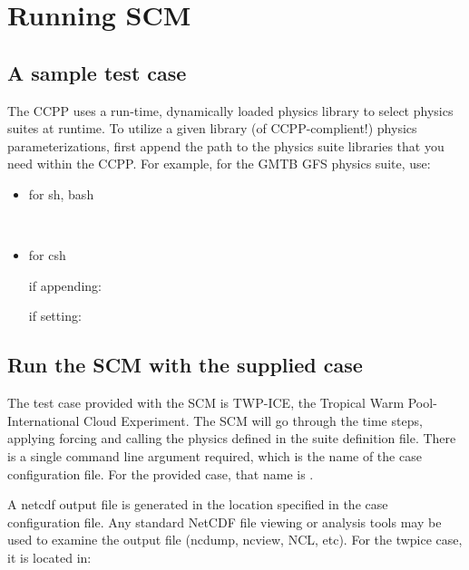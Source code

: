 \chapter{Running SCM}
\label{chapter: runningscm}
\setlength{\parskip}{12pt}
\label{section: runningscm}

\section{A sample test case}

The CCPP uses a run-time, dynamically loaded physics library to select physics suites at runtime.  To utilize a given library (of CCPP-complient!) physics parameterizations, first append the path to the physics suite libraries that you need
within the CCPP. For example, for the GMTB GFS physics suite, use:
\begin{itemize}
	\item for sh, bash

     \\

	\item for csh

     if appending: \\

     if setting: \\
\end{itemize}


\section{Run the SCM with the supplied case} 
The test case provided with the SCM is TWP-ICE, the Tropical Warm Pool-International Cloud Experiment. The SCM will go through the time steps, applying forcing and calling the physics defined in the suite definition file.
There is a single command line argument required, which is the name of the case configuration file.  For the provided case, that name is .


A netcdf output file is generated in the location specified in the case
configuration file. Any standard NetCDF file viewing or analysis tools may be used to 
examine the output file (ncdump, ncview, NCL, etc).  For the twpice case, it is located in:

